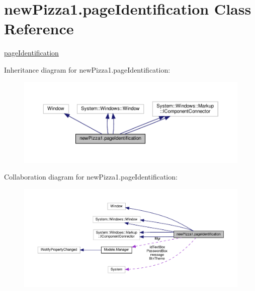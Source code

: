 \hypertarget{classnewPizza1_1_1pageIdentification}{}\section{new\+Pizza1.\+page\+Identification Class Reference}
\label{classnewPizza1_1_1pageIdentification}


\hyperlink{classnewPizza1_1_1pageIdentification}{page\+Identification}  




Inheritance diagram for new\+Pizza1.\+page\+Identification\+:
\nopagebreak
\begin{figure}[H]
\begin{center}
\leavevmode
\includegraphics[width=350pt]{classnewPizza1_1_1pageIdentification__inherit__graph}
\end{center}
\end{figure}


Collaboration diagram for new\+Pizza1.\+page\+Identification\+:
\nopagebreak
\begin{figure}[H]
\begin{center}
\leavevmode
\includegraphics[width=350pt]{classnewPizza1_1_1pageIdentification__coll__graph}
\end{center}
\end{figure}
